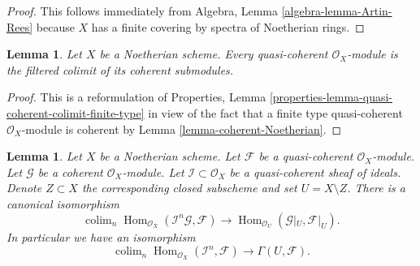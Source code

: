 \documentclass{stacks-project}
\theoremstyle{plain}
\newtheorem{lemma}[subsection]{Lemma}
\theoremstyle{definition}
\theoremstyle{remark}
\numberwithin{equation}{subsection}
\def\colim{\mathop{\mathrm{colim}}\nolimits}
\def\Hom{\mathop{\mathrm{Hom}}\nolimits}
\begin{document}
\begin{proof}
This follows immediately from
Algebra, Lemma \ref{algebra-lemma-Artin-Rees}
because $X$ has a finite covering by spectra of Noetherian rings.
\end{proof}

\begin{lemma}
\label{lemma-directed-colimit-coherent}
Let $X$ be a Noetherian scheme. Every quasi-coherent $\mathcal{O}_X$-module
is the filtered colimit of its coherent submodules.
\end{lemma}

\begin{proof}
This is a reformulation of Properties, Lemma
\ref{properties-lemma-quasi-coherent-colimit-finite-type}
in view of the fact that a finite type quasi-coherent
$\mathcal{O}_X$-module is coherent by
Lemma \ref{lemma-coherent-Noetherian}.
\end{proof}

\begin{lemma}
\label{lemma-homs-over-open}
Let $X$ be a Noetherian scheme.
Let $\mathcal{F}$ be a quasi-coherent $\mathcal{O}_X$-module.
Let $\mathcal{G}$ be a coherent $\mathcal{O}_X$-module.
Let $\mathcal{I} \subset \mathcal{O}_X$ be a quasi-coherent sheaf of
ideals. Denote $Z \subset X$ the corresponding closed subscheme and
set $U = X \setminus Z$.
There is a canonical isomorphism
$$
\colim_n \Hom_{\mathcal{O}_X}(\mathcal{I}^n\mathcal{G}, \mathcal{F})
\longrightarrow
\Hom_{\mathcal{O}_U}(\mathcal{G}|_U, \mathcal{F}|_U).
$$
In particular we have an isomorphism
$$
\colim_n \Hom_{\mathcal{O}_X}(
\mathcal{I}^n, \mathcal{F})
\longrightarrow
\Gamma(U, \mathcal{F}).
$$
\end{lemma}
\end{document}
